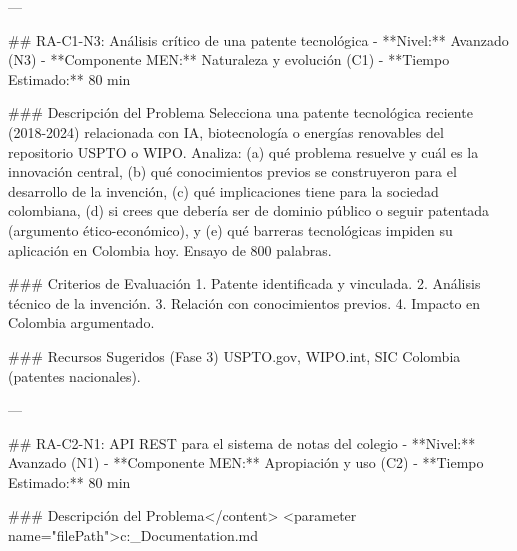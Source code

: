 ---

## RA-C1-N3: Análisis crítico de una patente tecnológica
- **Nivel:** Avanzado (N3)
- **Componente MEN:** Naturaleza y evolución (C1)
- **Tiempo Estimado:** 80 min

### Descripción del Problema
Selecciona una patente tecnológica reciente (2018-2024) relacionada con IA, biotecnología o energías renovables del repositorio USPTO o WIPO. Analiza: (a) qué problema resuelve y cuál es la innovación central, (b) qué conocimientos previos se construyeron para el desarrollo de la invención, (c) qué implicaciones tiene para la sociedad colombiana, (d) si crees que debería ser de dominio público o seguir patentada (argumento ético-económico), y (e) qué barreras tecnológicas impiden su aplicación en Colombia hoy. Ensayo de 800 palabras.

### Criterios de Evaluación
1. Patente identificada y vinculada. 2. Análisis técnico de la invención. 3. Relación con conocimientos previos. 4. Impacto en Colombia argumentado.

### Recursos Sugeridos (Fase 3)
USPTO.gov, WIPO.int, SIC Colombia (patentes nacionales).

---

## RA-C2-N1: API REST para el sistema de notas del colegio
- **Nivel:** Avanzado (N1)
- **Componente MEN:** Apropiación y uso (C2)
- **Tiempo Estimado:** 80 min

### Descripción del Problema</content>
<parameter name="filePath">c:\Users\Cristian\Downloads\MetaPathFinder\MetaPathFinder_Documentation.md